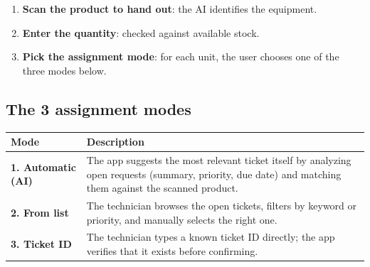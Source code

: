\documentclass[11pt,a4paper]{article}
\begin{document}
\begin{enumerate}
  \item \textbf{Scan the product to hand out}: the AI identifies the
        equipment.
  \item \textbf{Enter the quantity}: checked against available stock.
  \item \textbf{Pick the assignment mode}: for each unit, the user
        chooses one of the three modes below.
\end{enumerate}

\vspace{4pt}
\begin{center}
\end{center}

\subsection{The 3 assignment modes}

\begin{center}
\begin{tabularx}{\linewidth}{@{}lX@{}}
\toprule
\textbf{Mode}            & \textbf{Description}\\
\midrule
\textbf{1. Automatic (AI)} & The app suggests the most relevant ticket
    itself by analyzing open requests (summary, priority, due date)
    and matching them against the scanned product.\\
\addlinespace
\textbf{2. From list}     & The technician browses the open tickets,
    filters by keyword or priority, and manually selects the right
    one.\\
\addlinespace
\textbf{3. Ticket ID}     & The technician types a known ticket ID
    directly; the app verifies that it exists before confirming.\\
\bottomrule
\end{tabularx}
\end{center}
\end{document}
